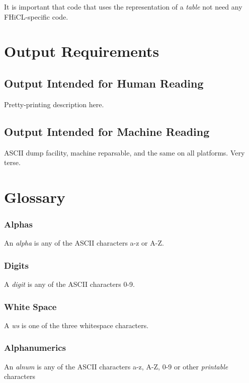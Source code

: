 \documentclass{memarticle}
\begin{document}
		It is important that code that uses the representation of a
		\emph{table} not need any FHiCL-specific code.

\section{Output Requirements}

	\subsection{Output Intended for Human Reading}
  		Pretty-printing description here.
	\subsection{Output Intended for Machine Reading}
  		ASCII dump facility, machine reparsable, and the same on all
  		platforms. Very terse.

\section{Glossary}
		\subsubsection{Alphas}
			An \emph{alpha} is any of the ASCII characters a-z or A-Z.
		\subsubsection{Digits}
			A \emph{digit} is any of the ASCII characters 0-9.
		\subsubsection{White Space}
			A \emph{ws} is one of the three whitespace characters.
		\subsubsection{Alphanumerics}
			An \emph{alnum} is any of the ASCII characters a-z, A-Z, 0-9 or other \emph{printable} characters


\end{document}
